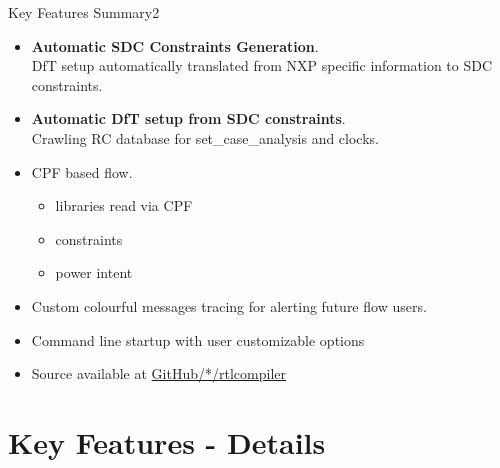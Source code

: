 \documentclass{beamer}
\begin{document}
\begin{frame}{Key Features Summary}{2}
	\begin{itemize}[<+->]
	 \item \textbf{Automatic SDC Constraints Generation}. \\ DfT setup automatically translated from NXP specific information to SDC constraints.
	 \item \textbf{Automatic DfT setup from SDC constraints}. \\ Crawling RC database for set\_case\_analysis and clocks.
	 \item CPF based flow.
		\begin{itemize}
		\item libraries read via CPF
		\item constraints
		\item power intent
		\end{itemize}
	\item Custom colourful  messages tracing for alerting future flow users.
	\item Command line startup with user customizable options
	\item Source available at \href{https://github.com/octavsly/rtlcompiler}{GitHub/*/rtlcompiler}
	\end{itemize}
\end{frame}

\section{Key Features - Details}
\end{document}
